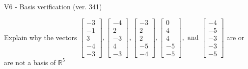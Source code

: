 \begin{exercise}
  \begin{exerciseTitle}V6 - Basis verification (ver. 341)\end{exerciseTitle}
  \begin{exerciseStatement}
    Explain why the vectors \(\left[\begin{array}{r}
-3 \\
-1 \\
3 \\
-4 \\
-3
\end{array}\right] , \left[\begin{array}{r}
-4 \\
2 \\
-3 \\
4 \\
-3
\end{array}\right] , \left[\begin{array}{r}
-3 \\
2 \\
2 \\
-5 \\
-4
\end{array}\right] , \left[\begin{array}{r}
0 \\
4 \\
4 \\
-5 \\
-5
\end{array}\right] , \text{ and } \left[\begin{array}{r}
-4 \\
-5 \\
-3 \\
-3 \\
-5
\end{array}\right]\) are or are not a basis of \(\mathbb{R}^5\)	



\end{exerciseStatement}
\end{exercise}
